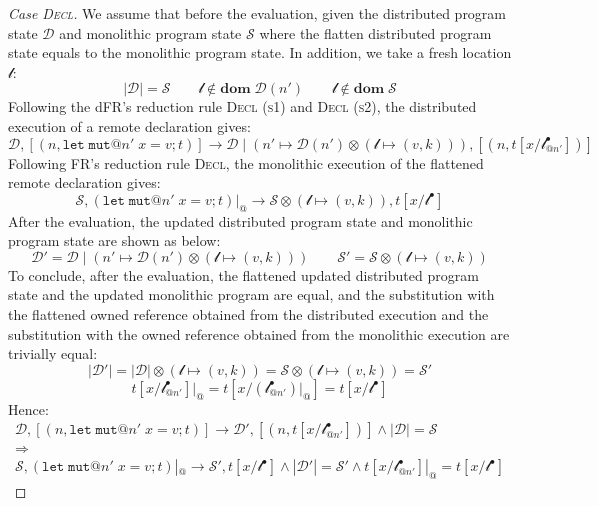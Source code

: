 \begin{proof}[Case \textsc{\emph{Decl}}]
We assume that before the evaluation, given the distributed program state $\mathcal{D}$ and monolithic program state $\mathcal{S}$ where the flatten distributed program state equals to the monolithic program state. In addition, we take a fresh location $\mathscr{l}$:
\[
|\mathcal{D}| = \mathcal{S} \quad\quad \mathscr{l} \notin \textbf{dom}\; \mathcal{D}(n') \quad\quad \mathscr{l} \notin \textbf{dom}\; \mathcal{S}
\]
Following the dFR's reduction rule \textsc{Decl (s1)} and \textsc{Decl (s2)}, the distributed execution of a remote declaration gives:
\[
\mathcal{D}, [(n, \texttt{let}\;\texttt{mut}@n'\;x = v;t)] \longrightarrow \mathcal{D} \mid (n' \mapsto \mathcal{D}(n')\otimes(\mathscr{l} \mapsto (v, k))), [(n, t[x/\mathscr{l}^\bullet_{@n'}])]
\]
Following FR's reduction rule \textsc{Decl}, the monolithic execution of the flattened remote declaration gives:
\[
\mathcal{S}, (\texttt{let}\;\texttt{mut}@n'\;x = v;t)|_@ \longrightarrow \mathcal{S} \otimes (\mathscr{l} \mapsto (v, k)), t[x/\mathscr{l}^\bullet]
\]
After the evaluation, the updated distributed program state and monolithic program state are shown as below:
\[
\mathcal{D}' = \mathcal{D} \mid (n' \mapsto \mathcal{D}(n')\otimes(\mathscr{l} \mapsto (v, k))) \quad\quad
\mathcal{S}' = \mathcal{S} \otimes (\mathscr{l} \mapsto (v, k))
\]
To conclude, after the evaluation, the flattened updated distributed program state and the updated monolithic program are equal, and the substitution with the flattened owned reference obtained from the distributed execution and the substitution with the owned reference obtained from the monolithic execution are trivially equal:
\[
|\mathcal{D}'| = |\mathcal{D}| \otimes (\mathscr{l} \mapsto (v, k)) = \mathcal{S} \otimes (\mathscr{l} \mapsto (v, k)) = \mathcal{S}'\]\[ t[x/\mathscr{l}^\bullet_{@n'}]|_@ = t[x/(\mathscr{l}^\bullet_{@n'})|_@] = t[x/\mathscr{l}^\bullet]
\]
Hence:
\begin{gather*}
\mathcal{D}, [(n, \texttt{let}\;\texttt{mut}@n'\;x = v;t)] \longrightarrow \mathcal{D'}, [(n, t[x/\mathscr{l}^\bullet_{@n'}])] \land |\mathcal{D}| = \mathcal{S} \\\Rightarrow\\ \mathcal{S}, (\texttt{let}\;\texttt{mut}@n'\;x = v;t)|_@ \longrightarrow \mathcal{S'}, t[x/\mathscr{l}^\bullet] \land |\mathcal{D}'| = \mathcal{S}' \land t[x/\mathscr{l}^\bullet_{@n'}]|_@ = t[x/\mathscr{l}^\bullet]
\end{gather*}

\end{proof}
